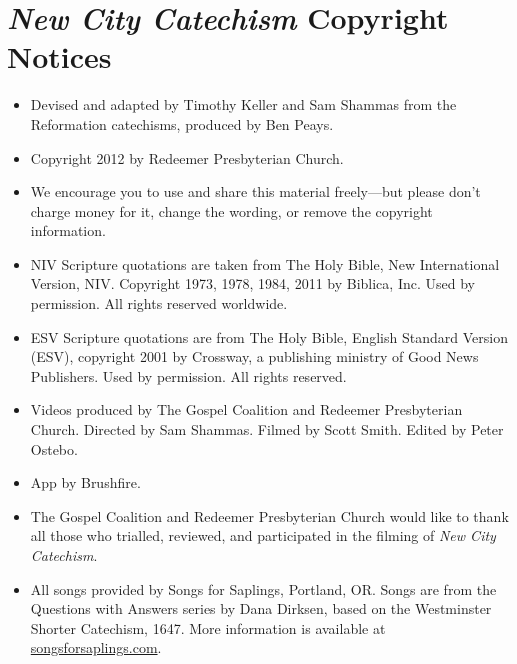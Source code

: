 \documentclass[00-main.tex]{subfiles}
\begin{document}
\cleardoublepage

\normalsize

\section*{{\em New City Catechism}\/ Copyright Notices}

\begin{itemize}
	\item Devised and adapted by Timothy Keller and Sam Shammas from the Reformation catechisms, produced by Ben Peays.
	\item Copyright {\textcopyright} 2012 by Redeemer Presbyterian Church.
	\item We encourage you to use and share this material freely\thinspace{}---\thinspace{}but please don't charge money for it, change the wording, or remove the copyright information.
	\item NIV Scripture quotations are taken from The Holy Bible, New International Version,\textsuperscript{{\textregistered}} NIV\textsuperscript{{\textregistered}}. Copyright {\textcopyright} 1973, 1978, 1984, 2011 by Biblica, Inc.{\texttrademark} Used by permission. All rights reserved worldwide.
	\item ESV Scripture quotations are from The Holy Bible, English Standard Version\textsuperscript{{\textregistered}} (ESV\textsuperscript{{\textregistered}}), copyright {\textcopyright} 2001 by Crossway, a publishing ministry of Good News Publishers. Used by permission. All rights reserved.
	\item {\sloppy Videos produced by The Gospel Coalition and Redeemer Presbyterian Church. Directed by Sam Shammas. Filmed by Scott Smith. Edited by Peter Ostebo.}
	\item App by Brushfire.
	\item The Gospel Coalition and Redeemer Presbyterian Church would like to thank all those who trialled, reviewed, and participated in the filming of {\em New City Catechism}.
	\item All songs provided by Songs for Saplings, Portland, OR. Songs are from the Questions with Answers series by Dana Dirksen, based on the Westminster Shorter Catechism, 1647. More information is available at \href{songsforsaplings.com}{songs\hspace{0em}for\hspace{0em}sap\hspace{0em}lings.\hspace{0em}com}.
\end{itemize}
\end{document}
